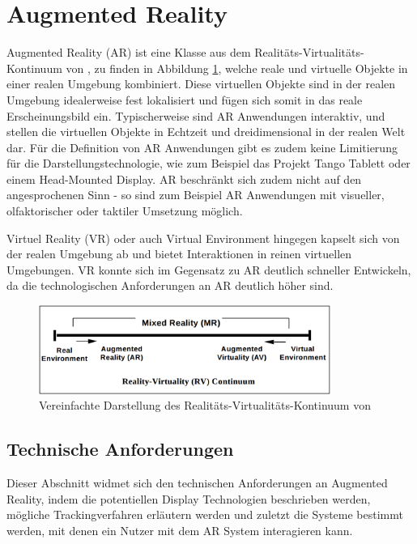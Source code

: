 
\section{Augmented Reality}

Augmented Reality (AR) ist eine Klasse aus dem Realitäts-Virtualitäts-Kontinuum von \cite{milgram1995augmented}, zu finden in Abbildung \ref{fig:virtual-continuum}, welche reale und virtuelle Objekte in einer realen Umgebung kombiniert. Diese virtuellen Objekte sind in der realen Umgebung idealerweise fest lokalisiert und fügen sich somit in das reale Erscheinungsbild ein. Typischerweise sind AR Anwendungen interaktiv, und stellen die virtuellen Objekte in Echtzeit und dreidimensional in der realen Welt dar. Für die Definition von AR Anwendungen gibt es zudem keine Limitierung für die Darstellungstechnologie, wie zum Beispiel das Projekt Tango Tablett oder einem Head-Mounted Display. AR beschränkt sich zudem nicht auf den angesprochenen Sinn - so sind zum Beispiel AR Anwendungen mit visueller, olfaktorischer oder taktiler Umsetzung möglich.

Virtuel Reality (VR) oder auch Virtual Environment hingegen kapselt sich von der realen Umgebung ab und bietet Interaktionen in reinen virtuellen Umgebungen. VR konnte sich im Gegensatz zu AR deutlich schneller Entwickeln, da die technologischen Anforderungen an AR deutlich höher sind. \citep{van2010survey}

\begin{figure}
  \centering
	\includegraphics[width=0.85\textwidth]{content/images/virtual-continuum.png} 
  \caption{Vereinfachte Darstellung des Realitäts-Virtualitäts-Kontinuum von \citet*{milgram1995augmented}}
  \label{fig:virtual-continuum}
\end{figure}

\subsection{Technische Anforderungen}

Dieser Abschnitt widmet sich den technischen Anforderungen an Augmented Reality, indem die potentiellen Display Technologien beschrieben werden, mögliche Trackingverfahren erläutern werden und zuletzt die Systeme bestimmt werden, mit denen ein Nutzer mit dem AR System interagieren kann.

